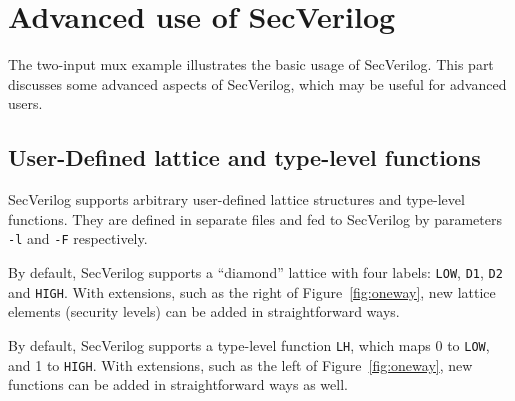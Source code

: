 \documentclass [12pt, oneside, a4paper]{article}
\newcommand{\code}[1]{\texttt{#1}}
\begin{document}
{%

\section{Advanced use of SecVerilog}

The two-input mux example illustrates the basic usage of SecVerilog.
This part discusses some advanced aspects of SecVerilog, which may be
useful for advanced users.

\subsection{User-Defined lattice and type-level functions}

SecVerilog supports arbitrary user-defined lattice structures and
type-level functions. They are defined in separate files and fed to
SecVerilog by parameters \code{-l} and \code{-F} respectively.

By default, SecVerilog supports a ``diamond'' lattice with four
labels: \code{LOW}, \code{D1}, \code{D2} and \code{HIGH}. With
extensions, such as the right of Figure~\ref{fig:oneway}, new lattice
elements (security levels) can be added in straightforward ways.

By default, SecVerilog supports a type-level function \code{LH}, which
maps 0 to \code{LOW}, and 1 to \code{HIGH}. With extensions, such as
the left of Figure~\ref{fig:oneway}, new functions can be added in
straightforward ways as well.

}
\end{document}
